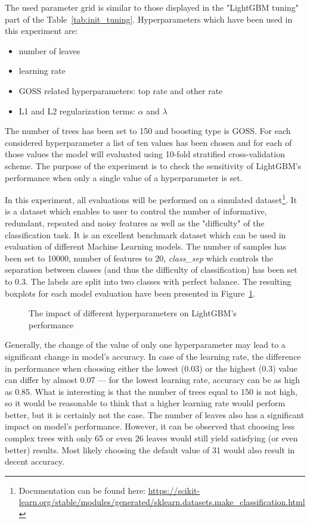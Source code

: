 \documentclass[magisterska, english]{pwr_wmat_praca_dyplomowa}
\theoremstyle{plain}
\numberwithin{theorem}{chapter}
\theoremstyle{definition}
\numberwithin{theorem}{chapter}
\begin{document}
The used parameter grid is similar to those displayed in the "LightGBM tuning" part of the Table~\ref{tab:init_tuning}. Hyperparameters which have been used in this experiment are:

\begin{itemize}
    \item number of leaves
    \item learning rate
    \item GOSS related hyperparameters: top rate and other rate
    \item L1 and L2 regularization terms: $\alpha$ and $\lambda$
\end{itemize}


The number of trees has been set to 150 and boosting type is GOSS. For each considered hyperparameter a list of ten values has been chosen and for each of those values the model will evaluated using 10-fold stratified cross-validation scheme. The purpose of the experiment is to check the sensitivity of LightGBM's performance when only a single value of a hyperparameter is set. 

In this experiment, all evaluations will be performed on a simulated dataset\footnote{Documentation can be found here: \url{https://scikit-learn.org/stable/modules/generated/sklearn.datasets.make_classification.html}}. It is a dataset which enables to user to control the number of informative, redundant, repeated and noisy features as well as the "difficulty" of the classification task. It is an excellent benchmark dataset which can be used in evaluation of different Machine Learning models. The number of samples has been set to 10000, number of features to 20, \emph{class\_sep} which controls the separation between classes (and thus the difficulty of classification) has been set to 0.3. The labels are split into two classes with perfect balance. The resulting boxplots for each model evaluation have been presented in Figure~\ref{fig:lightgbm_tuning}.

\begin{figure}[H]
	\centering
	\caption{The impact of different hyperparameters on LightGBM's performance}
	\label{fig:lightgbm_tuning}
\end{figure}

Generally, the change of the value of only one hyperparameter may lead to a significant change in model's accuracy. In case of the learning rate, the difference in performance when choosing either the lowest (0.03) or the highest (0.3) value can differ by almost 0.07 --- for the lowest learning rate, accuracy can be as high as 0.85. What is interesting is that the number of trees equal to 150 is not high, so it would be reasonable to think that a higher learning rate would perform better, but it is certainly not the case. The number of leaves also has a significant impact on model's performance. However, it can be observed that choosing less complex trees with only 65 or even 26 leaves would still yield satisfying (or even better) results. Most likely choosing the default value of 31 would also result in decent accuracy. 
\end{document}
